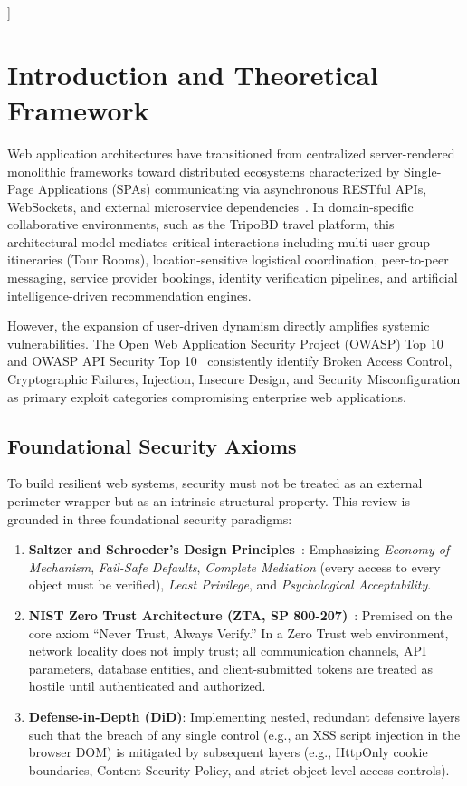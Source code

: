 \documentclass[10pt,twocolumn,a4paper]{article}
\begin{document}
\begin{@twocolumnfalse}
\begin{abstract}
    \end{abstract}
    \vspace{1.5em}
  \end{@twocolumnfalse}
]

\section{Introduction and Theoretical Framework}
Web application architectures have transitioned from centralized server-rendered monolithic frameworks toward distributed ecosystems characterized by Single-Page Applications (SPAs) communicating via asynchronous RESTful APIs, WebSockets, and external microservice dependencies~\cite{de2014security}. In domain-specific collaborative environments, such as the TripoBD travel platform, this architectural model mediates critical interactions including multi-user group itineraries (Tour Rooms), location-sensitive logistical coordination, peer-to-peer messaging, service provider bookings, identity verification pipelines, and artificial intelligence-driven recommendation engines.

However, the expansion of user-driven dynamism directly amplifies systemic vulnerabilities. The Open Web Application Security Project (OWASP) Top 10~\cite{owasp_top10_2021} and OWASP API Security Top 10~\cite{owasp_api_2023} consistently identify Broken Access Control, Cryptographic Failures, Injection, Insecure Design, and Security Misconfiguration as primary exploit categories compromising enterprise web applications.

\subsection{Foundational Security Axioms}
To build resilient web systems, security must not be treated as an external perimeter wrapper but as an intrinsic structural property. This review is grounded in three foundational security paradigms:
\begin{enumerate}[leftmargin=*]
    \item \textbf{Saltzer and Schroeder's Design Principles}~\cite{saltzer1975protection}: Emphasizing \textit{Economy of Mechanism}, \textit{Fail-Safe Defaults}, \textit{Complete Mediation} (every access to every object must be verified), \textit{Least Privilege}, and \textit{Psychological Acceptability}.
    \item \textbf{NIST Zero Trust Architecture (ZTA, SP 800-207)}~\cite{nist_sp800_207}: Premised on the core axiom ``Never Trust, Always Verify.'' In a Zero Trust web environment, network locality does not imply trust; all communication channels, API parameters, database entities, and client-submitted tokens are treated as hostile until authenticated and authorized.
    \item \textbf{Defense-in-Depth (DiD)}: Implementing nested, redundant defensive layers such that the breach of any single control (e.g., an XSS script injection in the browser DOM) is mitigated by subsequent layers (e.g., HttpOnly cookie boundaries, Content Security Policy, and strict object-level access controls).
\end{enumerate}
\end{document}
